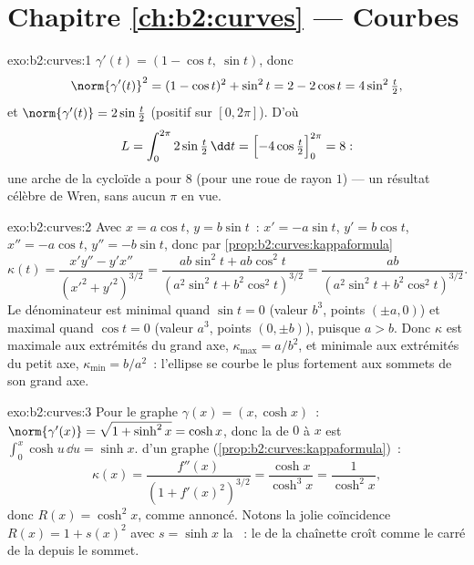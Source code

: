 \section*{Chapitre \ref{ch:b2:curves} --- Courbes}

\begin{solution}{exo:b2:curves:1}
$\gamma'(t) = (1 - \cos t,\ \sin t)$, donc
\[
\norm{\gamma'(t)}^2 = (1 - \cos t)^2 + \sin^2 t
= 2 - 2\cos t = 4\sin^2\tfrac t2 ,
\]
et $\norm{\gamma'(t)} = 2\sin\frac t2$ (positif sur $[0,
2\pi]$). D'où
\[
L = \int_0^{2\pi} 2\sin\tfrac t2\,\dd t
= \Bigl[-4\cos\tfrac t2\Bigr]_0^{2\pi} = 8 :
\]
une arche de la cycloïde a pour  $8$ (pour une roue de
rayon $1$) --- un résultat célèbre de Wren, sans aucun $\pi$ en
vue.
\end{solution}

\begin{solution}{exo:b2:curves:2}
Avec $x = a\cos t$, $y = b\sin t$~: $x' = -a\sin t$, $y' = b\cos
t$, $x'' = -a\cos t$, $y'' = -b\sin t$, donc par
\cref{prop:b2:curves:kappaformula}
\[
\kappa(t)
= \frac{x'y'' - y'x''}{(x'^2 + y'^2)^{3/2}}
= \frac{ab\sin^2 t + ab\cos^2 t}
       {(a^2\sin^2 t + b^2\cos^2 t)^{3/2}}
= \frac{ab}{(a^2\sin^2 t + b^2\cos^2 t)^{3/2}} .
\]
Le dénominateur est minimal quand $\sin t = 0$ (valeur $b^3$,
points $(\pm a, 0)$) et maximal quand $\cos t = 0$ (valeur $a^3$,
points $(0, \pm b)$), puisque $a > b$. Donc $\kappa$ est maximale
aux extrémités du grand axe, $\kappa_{\max} = a/b^2$, et minimale
aux extrémités du petit axe, $\kappa_{\min} = b/a^2$~: l'ellipse
se courbe le plus fortement aux sommets de son grand axe.
\end{solution}

\begin{solution}{exo:b2:curves:3}
Pour le graphe $\gamma(x) = (x, \cosh x)$~: $\norm{\gamma'(x)} =
\sqrt{1 + \sinh^2 x} = \cosh x$, donc la  de $0$ à
$x$
est $\int_0^x \cosh u\,\dd u = \sinh x$.  d'un graphe
(\cref{prop:b2:curves:kappaformula})~:
\[
\kappa(x) = \frac{f''(x)}{(1 + f'(x)^2)^{3/2}}
= \frac{\cosh x}{\cosh^3 x} = \frac{1}{\cosh^2 x} ,
\]
donc $R(x) = \cosh^2 x$, comme annoncé. Notons la jolie
coïncidence $R(x) = 1 + s(x)^2$ avec $s = \sinh x$ la ~: le  de la chaînette croît comme le carré
de la  depuis le sommet.
\end{solution}

